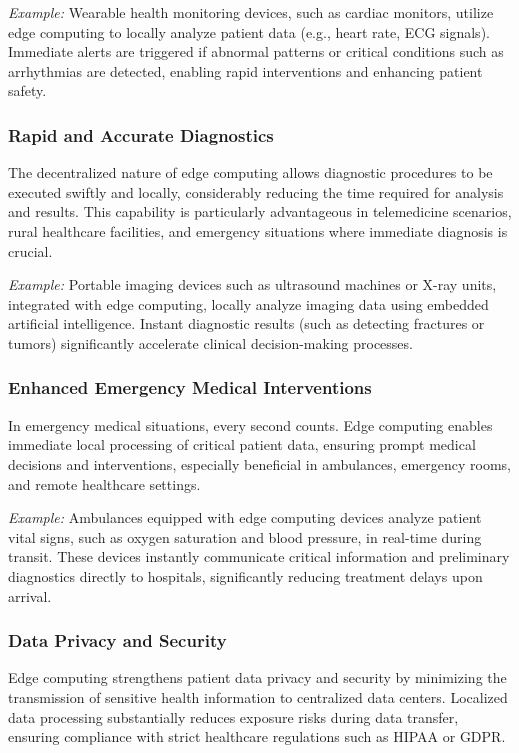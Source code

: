 \documentclass[runningheads]{llncs}
\begin{document}
\textit{Example:} Wearable health monitoring devices, such as cardiac monitors, utilize edge computing to locally analyze patient data (e.g., heart rate, ECG signals). Immediate alerts are triggered if abnormal patterns or critical conditions such as arrhythmias are detected, enabling rapid interventions and enhancing patient safety.

\subsubsection{Rapid and Accurate Diagnostics}
The decentralized nature of edge computing allows diagnostic procedures to be executed swiftly and locally, considerably reducing the time required for analysis and results. This capability is particularly advantageous in telemedicine scenarios, rural healthcare facilities, and emergency situations where immediate diagnosis is crucial.

\textit{Example:} Portable imaging devices such as ultrasound machines or X-ray units, integrated with edge computing, locally analyze imaging data using embedded artificial intelligence. Instant diagnostic results (such as detecting fractures or tumors) significantly accelerate clinical decision-making processes.

\subsubsection{Enhanced Emergency Medical Interventions}
In emergency medical situations, every second counts. Edge computing enables immediate local processing of critical patient data, ensuring prompt medical decisions and interventions, especially beneficial in ambulances, emergency rooms, and remote healthcare settings.

\textit{Example:} Ambulances equipped with edge computing devices analyze patient vital signs, such as oxygen saturation and blood pressure, in real-time during transit. These devices instantly communicate critical information and preliminary diagnostics directly to hospitals, significantly reducing treatment delays upon arrival.

\subsubsection{Data Privacy and Security}
Edge computing strengthens patient data privacy and security by minimizing the transmission of sensitive health information to centralized data centers. Localized data processing substantially reduces exposure risks during data transfer, ensuring compliance with strict healthcare regulations such as HIPAA or GDPR.
\end{document}
